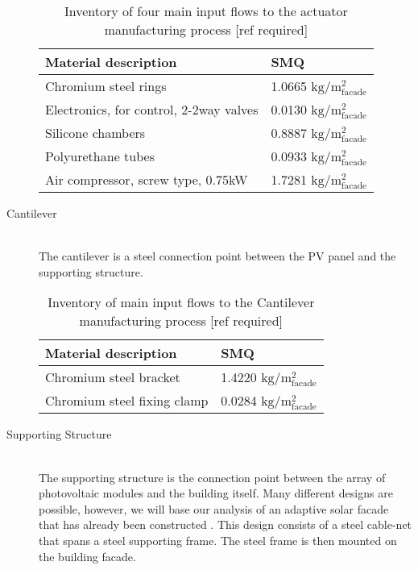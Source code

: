 \begin{description}
\begin{table}[H]
\centering
\begin{tabular}{ll}
\hline
Material description & SMQ \\ \hline
Chromium steel rings	 & 1.0665 ${\mathrm{kg/m^2_{facade}}}$ \\
Electronics, for control, 2-2way valves  & 0.0130  ${\mathrm{kg/m^2_{facade}}}$\\
Silicone chambers & 0.8887 ${\mathrm{kg/m^2_{facade}}}$\\
Polyurethane tubes &0.0933 ${\mathrm{kg/m^2_{facade}}}$\\
Air compressor, screw type, 0.75kW & 1.7281 ${\mathrm{kg/m^2_{facade}}}$\\
\hline
\end{tabular}
\caption{Inventory of four main input flows to the actuator manufacturing process [ref required]}
\label{tab:ActuatorInv}
\end{table}

\item[Cantilever] \hfill \\
The cantilever is a steel connection point between the PV panel and the supporting structure.\\

\begin{table}[H]
\centering
\begin{tabular}{ll}
\hline
Material description & SMQ \\ \hline
Chromium steel bracket	 & 1.4220 ${\mathrm{kg/m^2_{facade}}}$ \\
Chromium steel fixing clamp  & 0.0284 ${\mathrm{kg/m^2_{facade}}}$\\
\hline
\end{tabular}
\caption{Inventory of main input flows to the Cantilever manufacturing process [ref required]}
\label{tab:CantileverInv}
\end{table}

\item[Supporting Structure] \hfill \\
The supporting structure is the connection point between the array of photovoltaic modules and the building itself. Many different designs are possible, however, we will base our analysis of an adaptive solar facade that has already been constructed \cite{nagy2015frontiers}. This design consists of a steel cable-net that spans a steel supporting frame. The steel frame is then mounted on the building facade.\\


\end{description}

